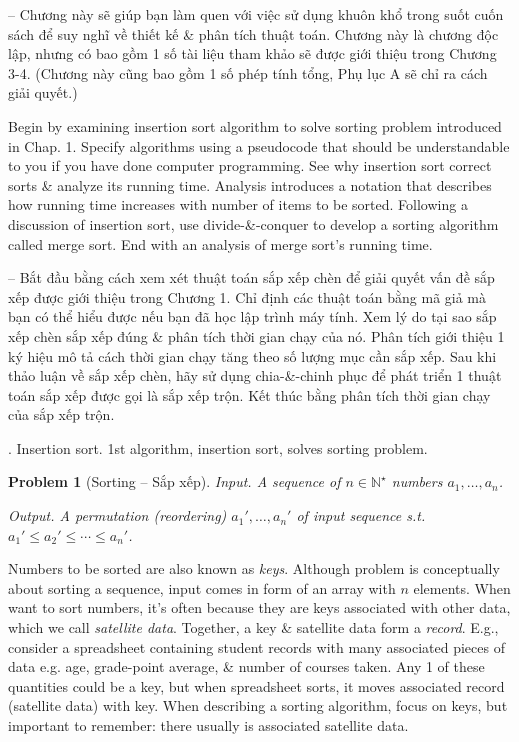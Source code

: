 \documentclass{article}
\newtheorem{problem}{Problem}
\begin{document}
\begin{itemize}
\begin{itemize}
        -- Chương này sẽ giúp bạn làm quen với việc sử dụng khuôn khổ trong suốt cuốn sách để suy nghĩ về thiết kế \& phân tích thuật toán. Chương này là chương độc lập, nhưng có bao gồm 1 số tài liệu tham khảo sẽ được giới thiệu trong Chương 3-4. (Chương này cũng bao gồm 1 số phép tính tổng, Phụ lục A sẽ chỉ ra cách giải quyết.)
        
        Begin by examining insertion sort algorithm to solve sorting problem introduced in Chap. 1. Specify algorithms using a pseudocode that should be understandable to you if you have done computer programming. See why insertion sort correct sorts \& analyze its running time. Analysis introduces a notation that describes how running time increases with number of items to be sorted. Following a discussion of insertion sort, use divide-\&-conquer to develop a sorting algorithm called merge sort. End with an analysis of merge sort's running time.
        
        -- Bắt đầu bằng cách xem xét thuật toán sắp xếp chèn để giải quyết vấn đề sắp xếp được giới thiệu trong Chương 1. Chỉ định các thuật toán bằng mã giả mà bạn có thể hiểu được nếu bạn đã học lập trình máy tính. Xem lý do tại sao sắp xếp chèn sắp xếp đúng \& phân tích thời gian chạy của nó. Phân tích giới thiệu 1 ký hiệu mô tả cách thời gian chạy tăng theo số lượng mục cần sắp xếp. Sau khi thảo luận về sắp xếp chèn, hãy sử dụng chia-\&-chinh phục để phát triển 1 thuật toán sắp xếp được gọi là sắp xếp trộn. Kết thúc bằng phân tích thời gian chạy của sắp xếp trộn.
        \begin{itemize}
            \item {. Insertion sort.} 1st algorithm, insertion sort, solves sorting problem.
            
            \begin{problem}[Sorting -- Sắp xếp]
                \item {\sf Input.} A sequence of $n\in\mathbb{N}^\star$ numbers $a_1,\ldots,a_n$.
                \item {\sf Output.} A permutation (reordering) $a_1',\ldots,a_n'$ of input sequence s.t. $a_1'\le a_2'\le\cdots\le a_n'$.
            \end{problem}
            Numbers to be sorted are also known as {\it keys}. Although problem is conceptually about sorting a sequence, input comes in form of an array with $n$ elements. When want to sort numbers, it's often because they are keys associated with other data, which we call {\it satellite data}. Together, a key \& satellite data form a {\it record}. E.g., consider a spreadsheet containing student records with many associated pieces of data e.g. age, grade-point average, \& number of courses taken. Any 1 of these quantities could be a key, but when spreadsheet sorts, it moves associated record (satellite data) with key. When describing a sorting algorithm, focus on keys, but important to remember: there usually is associated satellite data.
            

\end{itemize}
\end{itemize}
\end{itemize}
\end{document}
